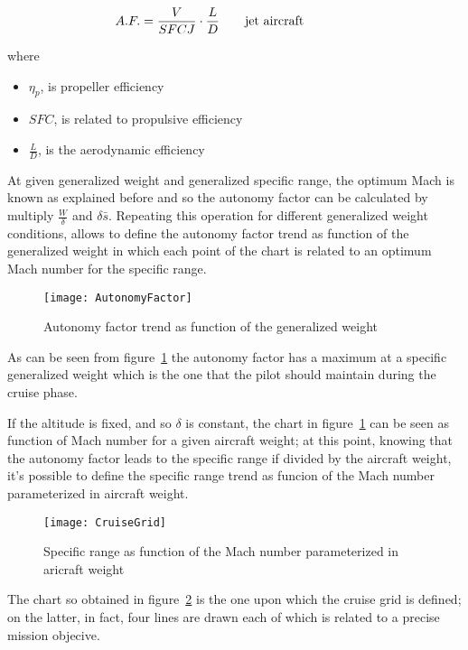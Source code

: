 \begin{eqnarray}
A.F.=\frac{V}{SFCJ}\cdot\frac{L}{D} %
\qquad \textrm {\parbox[t][][t]{.25\linewidth} {jet aircraft}}
\label{eqn:A.F.Equation5}
\end{eqnarray}

\noindent
where

\begin{itemize}
\item $\eta_{p}$, is propeller efficiency
\item $SFC$, is related to propulsive efficiency
\item $\frac{L}{D}$, is the aerodynamic efficiency
\end{itemize}

\noindent 
At given generalized weight and generalized specific range, the optimum Mach is known as explained before and so the autonomy factor can be calculated by multiply $\frac{W}{\delta}$ and $\delta\bar s$. Repeating this operation for different generalized weight conditions, allows to define the autonomy factor trend as function of the generalized weight in which each point of the chart is related to an optimum Mach number for the specific range.

\begin{figure}[t]
\centering
\texttt{[image: AutonomyFactor]}
\caption{Autonomy factor trend as function of the generalized weight}
\label{fig:Figure5}
\end{figure}

\noindent
As can be seen from figure~\ref{fig:Figure5} the autonomy factor has a maximum at a specific generalized weight which is the one that the pilot should maintain during the cruise phase. 

If the altitude is fixed, and so $\delta$ is constant, the chart in figure~\ref{fig:Figure5} can be seen as function of Mach number for a given aircraft weight; at this point, knowing that the autonomy factor leads to the specific range if divided by the aircraft weight, it's possible to define the specific range trend as funcion of the Mach number parameterized in aircraft weight. 

\begin{figure}[b]
\centering
\texttt{[image: CruiseGrid]}
\caption{Specific range as function of the Mach number parameterized in aricraft weight}
\label{fig:Figure6}
\end{figure}

\bigskip
\noindent
The chart so obtained in figure~\ref{fig:Figure6} is the one upon which the cruise grid is defined; on the latter, in fact, four lines are drawn each of which is related to a precise mission objecive.

